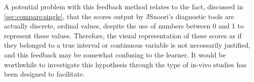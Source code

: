		  A potential problem with this feedback method relates to the fact, discussed in \cref{sec:compare:single}, that the scores output by JSnoori's diagnostic tools are actually discrete, ordinal values, despite the use of numbers between 0 and 1 to represent these values. Therefore, the visual representation of these scores as if they belonged to a true interval or continuous variable is not necessarily justified, and this feedback may be somewhat confusing to the learner. It would be worthwhile to investigate this hypothesis through the type of in-vivo studies  has been designed to facilitate. 
		
		
